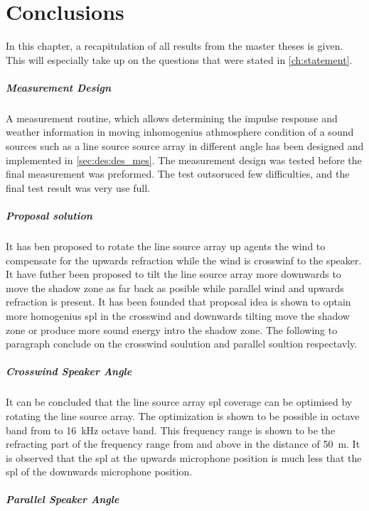 

\chapter{Conclusions}\label{sec:conclusion}
In this chapter, a recapitulation of all results from the master theses is given. This will especially take up on the questions that were stated in \autoref{ch:statement}.

\paragraph{Measurement Design}
A measurement routine, which allows determining the impulse response and weather information in moving inhomogenius athmosphere condition of a sound sources such as a line source source array in different angle has been designed and implemented in \autoref{sec:des:des_mes}. The measurement design was tested before the final measurement was preformed. The test outsoruced few difficulties, and the final test result was very use full.  




\paragraph{Proposal solution}
It has ben proposed to rotate the line source array up agents the wind to compensate for the upwards refraction while the wind is crosswinf to the speaker. It have futher been proposed to tilt the line source array more downwards to move the shadow zone as far back as posible while parallel wind and upwards refraction is present. It has been founded that proposal idea is shown to optain more homogenius \gls{spl} in the crosswind and downwards tilting move the shadow zone or produce more sound energy intro the shadow zone. The following to paragraph conclude on the crosswind soulution and parallel soultion respectavly.   




\paragraph{Crosswind Speaker Angle}
It can be concluded that the line source array \gls{spl} coverage can be optimised by rotating the line source array. The optimization is shown to be possible in octave band from  to \SI{16}{\kilo\hertz} octave band. This frequency range is shown to be the refracting part of the frequency range from  and above in the distance of \SI{50}{\meter}. It is observed that the \gls{spl} at the upwards microphone position is much less that the \gls{spl} of the downwards microphone position. 



\paragraph{Parallel Speaker Angle}






